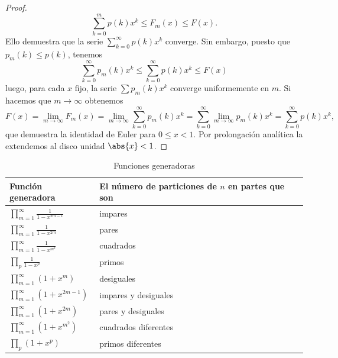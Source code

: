 \begin{proof}
\begin{equation*}
            \sum_{k=0}^{m}p(k)x^k\leq F_m(x)\leq F(x).
        \end{equation*}
        Ello demuestra que la serie $\sum_{k=0}^{\infty}p(k)x^k$ converge. Sin embargo, puesto
        que $p_m(k)\leq p(k)$, tenemos
        \begin{equation*}
            \sum_{k=0}^{\infty}p_m(k)x^k\leq\sum_{k=0}^{\infty}p(k)x^k\leq F(x)
        \end{equation*}
        luego, para cada $x$ fijo, la serie $\sum p_m(k)x^k$ converge uniformemente en $m$. Si
        hacemos que $m\to\infty$ obtenemos
        \begin{equation*}
            F(x)=\lim_{m\to\infty}F_m(x)=\lim_{m\to\infty}\sum_{k=0}^{\infty}p_m(k)x^k=\sum_{k=0}^{\infty}\lim_{m\to\infty}p_m(k)x^k=\sum_{k=0}^{\infty}p(k)x^k,
        \end{equation*}
        que demuestra la identidad de Euler para $0\leq x<1$. Por prolongación analítica la
        extendemos al disco unidad $\abs{x}<1$.
    \end{proof}

    \begin{table}[H]
        \centering
        \caption{Funciones generadoras}
        \begin{tabular}{@{}lp{5.5cm}@{}}
            \hline
            Función generadora&El número de particiones de $n$ en partes que son\\\hline
            $\displaystyle\prod_{m=1}^{\infty}\frac{1}{1-x^{2m-1}}$&impares\\[2.5ex]
            $\displaystyle\prod_{m=1}^{\infty}\frac{1}{1-x^{2m}}$&pares\\[2.5ex]
            $\displaystyle\prod_{m=1}^{\infty}\frac{1}{1-x^{m^2}}$&cuadrados\\[2.5ex]
            $\displaystyle\prod_p\frac{1}{1-x^p}$&primos\\[2.5ex]
            $\displaystyle\prod_{m=1}^{\infty}(1+x^m)$&desiguales\\[2.5ex]
            $\displaystyle\prod_{m=1}^{\infty}(1+x^{2m-1})$&impares y desiguales\\[2.5ex]
            $\displaystyle\prod_{m=1}^{\infty}(1+x^{2m})$&pares y desiguales\\[2.5ex]
            $\displaystyle\prod_{m=1}^{\infty}(1+x^{m^2})$&cuadrados diferentes\\[2.5ex]
            $\displaystyle\prod_p(1+x^p)$&primos diferentes\\\hline
        \end{tabular}
    \end{table}

